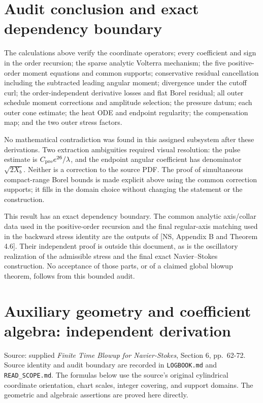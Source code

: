 \documentclass[10pt,a4paper]{article}
\begin{document}
\section{Audit conclusion and exact dependency boundary}
The calculations above verify the coordinate operators; every coefficient and
sign in the order recursion; the sparse analytic Volterra mechanism; the
five positive-order moment equations and common supports; conservative residual
cancellation including the subtracted leading angular moment; divergence under
the cutoff curl; the order-independent derivative losses and flat Borel
residual; all outer schedule moment corrections and amplitude selection; the
pressure datum; each outer cone estimate; the heat ODE and endpoint regularity;
the compensation map; and the two outer stress factors.

No mathematical contradiction was found in this assigned subsystem after
these derivations. Two extraction ambiguities required visual resolution:
the pulse estimate is $C_{\rm pre}e^{26}/\lambda$, and the endpoint angular
coefficient has denominator $\sqrt{2X_b}$. Neither is a correction to the source
PDF. The proof of simultaneous compact-range Borel bounds is made explicit
above using the common correction supports; it fills in the domain choice
without changing the statement or the construction.

This result has an exact dependency boundary. The common analytic axis/collar
data used in the positive-order recursion and the final regular-axis matching
used in the backward stress identity are the outputs of [NS, Appendix B and
Theorem 4.6]. Their independent proof is outside this document, as is
the oscillatory realization of the admissible stress and the final exact
Navier--Stokes construction. No acceptance of those parts, or of a claimed
global blowup theorem, follows from this bounded audit.


\section{Auxiliary geometry and coefficient algebra: independent derivation}\label{auxiliary-geometry-and-coefficient-algebra-independent-derivation}

Source: supplied \emph{Finite Time Blowup for Navier-Stokes}, Section 6, pp.~62-72. Source identity and audit boundary are recorded in \texttt{LOGBOOK.md} and \texttt{READ\_SCOPE.md}. The formulas below use the source's original cylindrical coordinate orientation, chart scales, integer covering, and support domains. The geometric and algebraic assertions are proved here directly.
\end{document}
